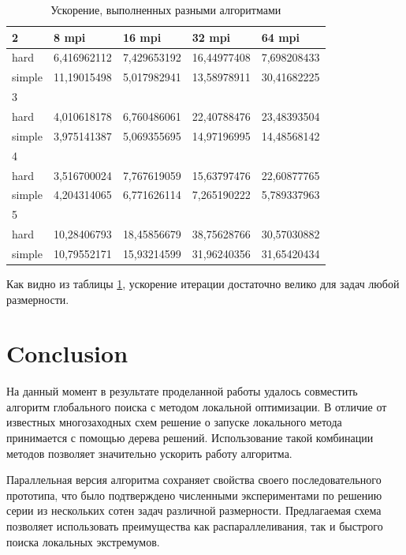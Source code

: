 \documentclass[runningheads]{llncs}
\begin{document}
\begin{table}[!ht]
	\caption{Ускорение, выполненных разными алгоритмами}
	\label{tab:2}
	\centering	
	\begin{tabular}{|l|l|l|l|l|}
		\hline
		2 & 8 mpi & 16 mpi & 32 mpi & 64 mpi  \\ \hline
		hard & 6,416962112 & 7,429653192 & 16,44977408 & 7,698208433  \\ \hline
		simple & 11,19015498 & 5,017982941 & 13,58978911 & 30,41682225  \\ \hline
		3 & ~ & ~ & ~ &   \\ \hline
		hard & 4,010618178 & 6,760486061 & 22,40788476 & 23,48393504  \\ \hline
		simple & 3,975141387 & 5,069355695 & 14,97196995 & 14,48568142  \\ \hline
		4 & ~ & ~ & ~ &   \\ \hline
		hard & 3,516700024 & 7,767619059 & 15,63797476 & 22,60877765  \\ \hline
		simple & 4,204314065 & 6,771626114 & 7,265190222 & 5,789337963  \\ \hline
		5 & ~ & ~ & ~ &   \\ \hline
		hard & 10,28406793 & 18,45856679 & 38,75628766 & 30,57030882  \\ \hline
		simple & 10,79552171 & 15,93214599 & 31,96240356 & 31,65420434  \\ \hline
	\end{tabular}
\end{table}




Как видно из таблицы \ref{tab:2}, ускорение итерации достаточно велико для задач любой размерности.





\section{Conclusion} 

На данный момент в результате проделанной работы удалось совместить алгоритм глобального поиска с методом локальной оптимизации. В отличие от известных многозаходных схем решение о запуске локального метода принимается с помощью дерева решений. Использование такой комбинации методов позволяет значительно ускорить работу алгоритма.

Параллельная версия алгоритма сохраняет свойства своего последовательного прототипа, что было подтверждено численными экспериментами по решению серии из нескольких сотен задач различной размерности. Предлагаемая схема позволяет использовать преимущества как распараллеливания, так и быстрого поиска локальных экстремумов.
\end{document}
